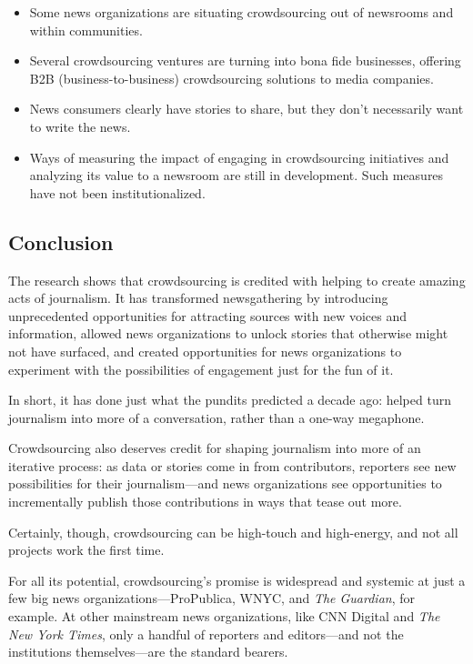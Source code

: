 \documentclass[notoc, symmetric, nobib, nols]{towcenter-guideto-book}
\begin{document}
\begin{itemize}
\item Some news organizations are situating crowdsourcing out of newsrooms and within communities. 

\item Several crowdsourcing ventures are turning into bona fide businesses, offering B2B (business-to-business) crowdsourcing solutions to media companies. 

\item News consumers clearly have stories to share, but they don't necessarily want to write the news.

\item Ways of measuring the impact of engaging in crowdsourcing initiatives and analyzing its value to a newsroom are still in development. Such measures have not been institutionalized.
\end{itemize}

\subsection{Conclusion} 

The research shows that crowdsourcing is credited with helping to create amazing acts of journalism. It has transformed newsgathering by introducing unprecedented opportunities for attracting sources with new voices and information, allowed news organizations to unlock stories that otherwise might not have surfaced, and created opportunities for news organizations to experiment with the possibilities of engagement just for the fun of it.

In short, it has done just what the pundits predicted a decade ago: helped turn journalism into more of a conversation, rather than a one-way megaphone. 

Crowdsourcing also deserves credit for shaping journalism into more of an iterative process: as data or stories come in from contributors, reporters see new possibilities for their journalism---and news organizations see opportunities to incrementally publish those contributions in ways that tease out more. 

Certainly, though, crowdsourcing can be high-touch and high-energy, and not all projects work the first time. 

For all its potential, crowdsourcing's promise is widespread and systemic at just a few big news organizations---ProPublica, WNYC, and \textit{The Guardian}, for example. At other mainstream news organizations, like CNN Digital and \textit{The New York Times}, only a handful of reporters and editors---and not the institutions themselves---are the standard bearers. 
\end{document}
